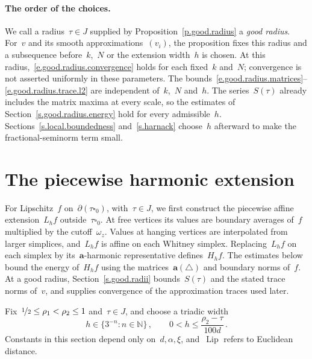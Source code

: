 \documentclass[11pt,letterpaper]{article}
\numberwithin{equation}{section}
\theoremstyle{definition}
\newcommand{\N}{\mathbb{N}}
\renewcommand{\a}{\mathbf{a}}
\newcommand{\nf}{\nicefrac}
\newcommand{\cu}{\square}
\begin{document}
\paragraph{The order of the choices.} We call a radius~$\tau\in J$ supplied by Proposition~\ref{p.good.radius} a \emph{good radius}. For~$v$ and its smooth approximations~$(v_i)$, the proposition fixes this radius and a subsequence before~$k$,~$N$ or the extension width~$h$ is chosen. At this radius,~\eqref{e.good.radius.convergence} holds for each fixed~$k$ and~$N$; convergence is not asserted uniformly in these parameters. The bounds~\eqref{e.good.radius.matrices}--\eqref{e.good.radius.trace.l2} are independent of~$k$,~$N$ and~$h$. The series~$S(\tau)$ already includes the matrix maxima at every scale, so the estimates of Section~\ref{s.good.radius.energy} hold for every admissible~$h$. Sections~\ref{s.local.boundedness} and~\ref{s.harnack} choose~$h$ afterward to make the fractional-seminorm term small.

\section{The piecewise harmonic extension}
\label{s.whitney.extension}

For Lipschitz~$f$ on~$\partial(\tau\cu_0)$, with~$\tau\in J$, we first construct the piecewise affine extension~$L_hf$ outside~$\tau\cu_0$. At free vertices its values are boundary averages of~$f$ multiplied by the cutoff~$\omega_z$. Values at hanging vertices are interpolated from larger simplices, and~$L_hf$ is affine on each Whitney simplex. Replacing~$L_hf$ on each simplex by its~$\a$-harmonic representative defines~$H_hf$. The estimates below bound the energy of~$H_hf$ using the matrices~$\a(\triangle)$ and boundary norms of~$f$. At a good radius, Section~\ref{s.good.radii} bounds~$S(\tau)$ and the stated trace norms of~$v$, and supplies convergence of the approximation traces used later.

\smallskip

Fix~$\nf12\leq\rho_1<\rho_2\leq1$ and~$\tau\in J$, and choose a triadic width
\begin{equation}
	h\in\{3^{-n}:n\in\N\}\,,\qquad 0<h\leq\frac{\rho_2-\tau}{100d}\,.
	\label{e.extension.width}
\end{equation}
Constants in this section depend only on~$d,\alpha,\xi$, and~$\operatorname{Lip}$ refers to Euclidean distance.
\end{document}
